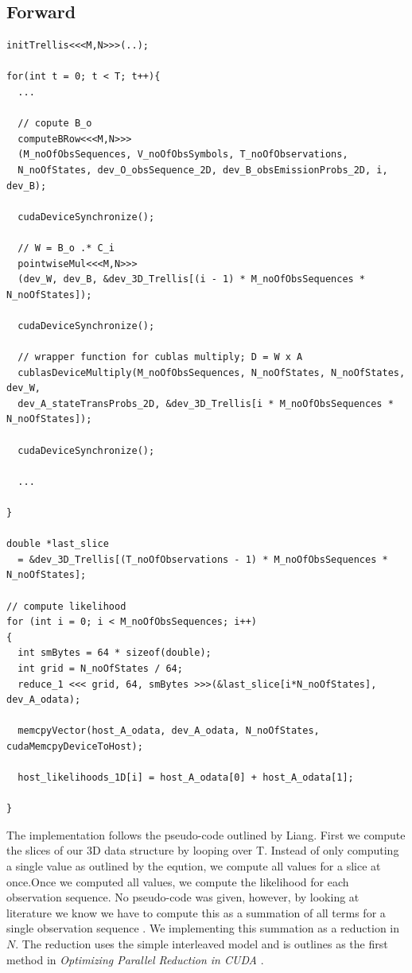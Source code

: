 \documentclass[english, paper=a4]{scrartcl}
\begin{document}
\subsection{Forward}
\begin{verbatim}
initTrellis<<<M,N>>>(..);

for(int t = 0; t < T; t++){
  ...
		
  // copute B_o
  computeBRow<<<M,N>>>
  (M_noOfObsSequences, V_noOfObsSymbols, T_noOfObservations, 
  N_noOfStates, dev_O_obsSequence_2D, dev_B_obsEmissionProbs_2D, i, dev_B);
		
  cudaDeviceSynchronize();
		
  // W = B_o .* C_i
  pointwiseMul<<<M,N>>>
  (dev_W, dev_B, &dev_3D_Trellis[(i - 1) * M_noOfObsSequences * N_noOfStates]);
		
  cudaDeviceSynchronize();
		
  // wrapper function for cublas multiply; D = W x A
  cublasDeviceMultiply(M_noOfObsSequences, N_noOfStates, N_noOfStates, dev_W, 
  dev_A_stateTransProbs_2D, &dev_3D_Trellis[i * M_noOfObsSequences * N_noOfStates]); 
		
  cudaDeviceSynchronize();
		
  ...
	
}
	
double *last_slice 
  = &dev_3D_Trellis[(T_noOfObservations - 1) * M_noOfObsSequences * N_noOfStates];	
	
// compute likelihood
for (int i = 0; i < M_noOfObsSequences; i++)
{
  int smBytes = 64 * sizeof(double);
  int grid = N_noOfStates / 64;
  reduce_1 <<< grid, 64, smBytes >>>(&last_slice[i*N_noOfStates], dev_A_odata);

  memcpyVector(host_A_odata, dev_A_odata, N_noOfStates, cudaMemcpyDeviceToHost);

  host_likelihoods_1D[i] = host_A_odata[0] + host_A_odata[1];

}
\end{verbatim}

The implementation follows the pseudo-code outlined by Liang. First we compute the slices of our 3D data structure by looping over T. Instead of only computing a single value as outlined by the eqution, we compute all values for a slice at once.Once we computed all values, we compute the likelihood for each observation sequence. No pseudo-code was given, however, by looking at literature we know we have to compute this as a summation of all terms for a single observation sequence \cite{hmm}. We implementing this summation as a reduction in \(N\). The reduction uses the simple interleaved model and is outlines as the first method in \textit{Optimizing Parallel Reduction in CUDA} \cite{reduction}.
\end{document}
